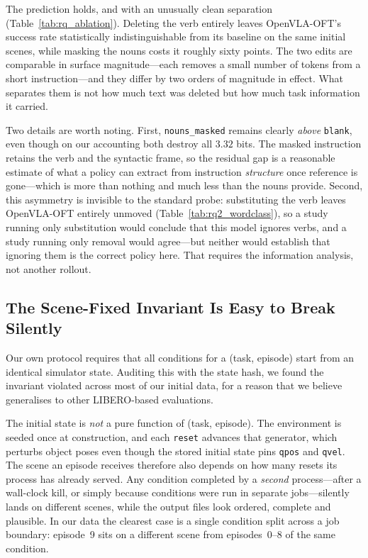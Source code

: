 \documentclass[11pt]{article}
\begin{document}
\begin{table}[h]
\centering
\small

\caption{Word-class \emph{removal}. \textbf{bits removed} is the task information the
edit destroys, computed from the suite alone (Section~\ref{sec:info});
$\Delta$ is against a baseline restricted to the same episodes, so it is a
within-scene contrast. }
\label{tab:rq_ablation}
\end{table}

The prediction holds, and with an unusually clean separation
(Table~\ref{tab:rq_ablation}). Deleting the verb entirely leaves OpenVLA-OFT's success
rate statistically indistinguishable from its baseline on the same initial scenes,
while masking the nouns costs it roughly sixty points. The two edits are comparable in
surface magnitude---each removes a small number of tokens from a short
instruction---and they differ by two orders of magnitude in effect. What separates them
is not how much text was deleted but how much task information it carried.

Two details are worth noting. First, \texttt{nouns\_masked} remains clearly \emph{above}
\texttt{blank}, even though on our accounting both destroy all $3.32$ bits. The masked
instruction retains the verb and the syntactic frame, so the residual gap is a
reasonable estimate of what a policy can extract from instruction \emph{structure}
once reference is gone---which is more than nothing and much less than the nouns
provide. Second, this asymmetry is invisible to the standard probe: substituting the
verb leaves OpenVLA-OFT entirely unmoved (Table~\ref{tab:rq2_wordclass}), so a study
running only substitution would conclude that this model ignores verbs, and a study
running only removal would agree---but neither would establish that ignoring them is
the correct policy here. That requires the information analysis, not another rollout.

\subsection{The Scene-Fixed Invariant Is Easy to Break Silently}
\label{sec:scenefixed}
Our own protocol requires that all conditions for a (task, episode) start from an
identical simulator state. Auditing this with the state hash, we found the
invariant violated across most of our initial data, for a reason that we believe
generalises to other LIBERO-based evaluations.

The initial state is \emph{not} a pure function of (task, episode). The
environment is seeded once at construction, and each \texttt{reset} advances that
generator, which perturbs object poses even though the stored initial state pins
\texttt{qpos} and \texttt{qvel}. The scene an episode receives therefore also
depends on how many resets its process has already served. Any condition
completed by a \emph{second} process---after a wall-clock kill, or simply because
conditions were run in separate jobs---silently lands on different scenes, while
the output files look ordered, complete and plausible. In our data the clearest
case is a single condition split across a job boundary: episode~9 sits on a
different scene from episodes~0--8 of the same condition.
\end{document}
